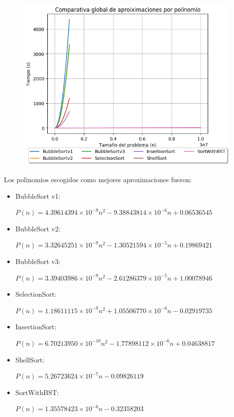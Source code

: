 \documentclass[12pt, fleqn]{report}                             %
\theoremstyle{break}                                            %
\begin{document}
    	        \begin{figure}[H]
    	            \centering
    	            \includegraphics[scale=0.9]{graphics/globalComparativePolynomial1.png}
    	        \end{figure}
    	        
    	        
    	    Los polinomios escogidos como mejores aproximaciones fueron:
    	    \begin{itemize}\setlength\itemsep{0em}
    	        \item BubbleSort v1:
    	        
    	        $P(n) = 4.39614394 \times 10^{-9} n^2 - 9.38843814 \times 10^{-6} n + 0.06536545$
    	        
    	        \item BubbleSort v2:
    	        
    	        $P(n) = 3.32645251 \times 10^{-9} n^2 - 1.30521594 \times 10^{-5} n + 0.19869421$
    	        
    	        \item BubbleSort v3:
    	        
    	        $P(n) = 3.39403986 \times 10^{-9} n^2 - 2.61286379 \times 10^{-5} n + 1.00078946$
    	        
    	        \item SelectionSort:
    	        
    	        $P(n) = 1.18611115 \times 10^{-9} n^2 + 1.05506770 \times 10^{-6} n - 0.02919735$
    	        
    	        \item InsertionSort:
    	        
    	        $P(n) = 6.70213950 \times 10^{-10} n^2 - 1.77898112 \times 10^{-6} n + 0.04638817$
    	        
    	        \item ShellSort:
    	        
    	        $P(n) = 5.26723624 \times 10^{-7} n - 0.09826119$
    	        
    	        \item SortWithBST:
    	        
    	        $P(n) = 1.35578423 \times 10^{-6} n - 0.32358203$
    	    \end{itemize}
    	    
\end{document}

